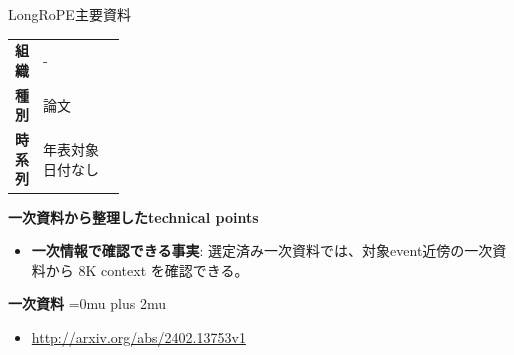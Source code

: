 \Needspace{0.38\textheight}
\begin{technicalnote}{LongRoPE}{主要資料}
\begingroup
\begin{tabularx}{\linewidth}{@{}>{\bfseries}p{0.22\linewidth}X@{}}
組織 & - \\
種別 & 論文 \\
時系列 & 年表対象日付なし \\
\end{tabularx}
\smallskip
\begin{minipage}{\linewidth}
{\bfseries 一次資料から整理したtechnical points}
\begin{itemize}[leftmargin=1.5em,itemsep=0.35em]
\item \textbf{一次情報で確認できる事実}: 選定済み一次資料では、対象event近傍の一次資料から 8K context を確認できる。
\end{itemize}
\begin{minipage}{\linewidth}
\begin{samepage}
{\bfseries 一次資料}
\begingroup\sloppy
\Urlmuskip=0mu plus 2mu\relax
\begin{itemize}[leftmargin=1.5em,itemsep=0.25em]
\item {\scriptsize\url{http://arxiv.org/abs/2402.13753v1}}
\end{itemize}
\endgroup
\end{samepage}
\end{minipage}
\end{minipage}
\endgroup
\end{technicalnote}
\medskip

